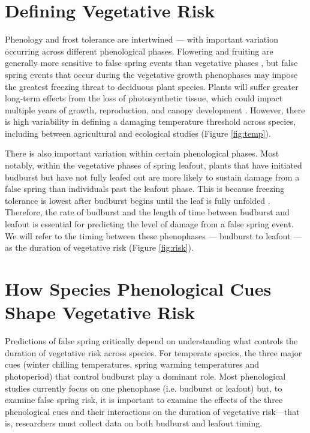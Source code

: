 \documentclass{article}\usepackage[]{graphicx}\usepackage[]{color}
\begin{document}
\section* {Defining Vegetative Risk} %
Phenology and frost tolerance are intertwined --- with important variation occurring across different phenological phases. Flowering and fruiting are generally more sensitive to false spring events than vegetative phases \citep{Augspurger2009, Lenz2013, Caradonna2016}, but false spring events that occur during the vegetative growth phenophases may impose the greatest freezing threat to deciduous plant species.  Plants will suffer greater long-term effects from the loss of photosynthetic tissue, which could impact multiple years of growth, reproduction, and canopy development \citep{Vitasse2014, Xie2015}. However, there is high variability in defining a damaging temperature threshold across species, including between agricultural and ecological studies (Figure \ref{fig:temp}).

There is also important variation within certain phenological phases. Most notably, within the vegetative phases of spring leafout, plants that have initiated budburst but have not fully leafed out are more likely to sustain damage from a false spring than individuals past the leafout phase. This is because freezing tolerance is lowest after budburst begins until the leaf is fully unfolded \citep{Lenz2016}. Therefore, the rate of budburst and the length of time between budburst and leafout is essential for predicting the level of damage from a false spring event. We will refer to the timing between these phenophases --- budburst to leafout --- as the duration of vegetative risk (Figure \ref{fig:risk}). %

\section* {How Species Phenological Cues Shape Vegetative Risk}
Predictions of false spring critically depend on understanding what controls the duration of vegetative risk across species. For temperate species, the three major cues (winter chilling temperatures, spring warming temperatures and photoperiod) that control budburst \citep%
{Chuine2010} play a dominant role. Most phenological studies currently focus on one phenophase (i.e. budburst or leafout) but, to examine false spring risk, it is important to examine the effects of the three phenological cues and their interactions on the duration of vegetative risk---that is, researchers must collect data on both budburst and leafout timing.  
\end{document}
